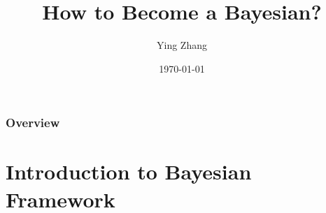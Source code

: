 \documentclass{beamer}
\title[Introduction to Bayesian Statistics]{How to Become a Bayesian?} %
\author{Ying Zhang} %
\institute[Renmin University of China] %
{
Renmin University of China \\ %
\medskip
\textit{zyjannis@ruc.edu.cn} %
}
\date{\today} %
\begin{document}
\begin{frame}
\titlepage %
\end{frame}

\begin{frame}
\frametitle{Overview} %
\tableofcontents %
\end{frame}

\beamerdefaultoverlayspecification{<+->}

\section{Introduction to Bayesian Framework} %
\begin{frame}
\sectionpage %
\end{frame}
\end{document}
